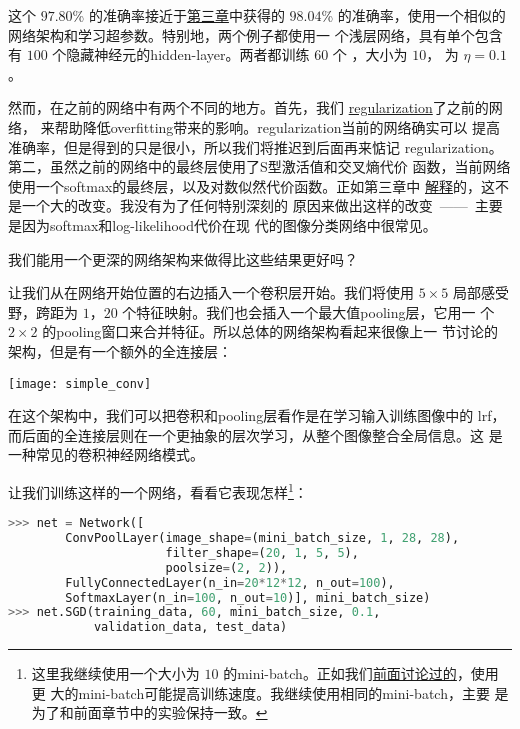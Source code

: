 这个 $97.80$\% 的准确率接近于\hyperref[chap3_98_04_percent]{第三章}中获得的
$98.04$\% 的准确率，使用一个相似的网络架构和学习超参数。特别地，两个例子都使用一
个浅层网络，具有单个包含有 $100$ 个隐藏神经元的\gls*{hidden-layer}。两者都训练 $60$ 个
\epochs{}，\minibatch{}大小为 $10$，\learningrate{} 为 $\eta = 0.1$。

然而，在之前的网络中有两个不同的地方。首先，我们%
\hyperref[sec:overfitting_and_regularization]{\gls*{regularization}}了之前的网络，
来帮助降低\gls*{overfitting}带来的影响。\gls*{regularization}当前的网络确实可以
提高准确率，但是得到的只是很小，所以我们将推迟到后面再来惦记%
\gls*{regularization}。第二，虽然之前的网络中的最终层使用了S型激活值和交叉熵代价
函数，当前网络使用一个\gls*{softmax}的最终层，以及对数似然代价函数。正如第三章中%
\hyperref[subsec:softmax]{解释}的，这不是一个大的改变。我没有为了任何特别深刻的
原因来做出这样的改变~——~主要是因为\gls*{softmax}和\gls*{log-likelihood}代价在现
代的图像分类网络中很常见。

我们能用一个更深的网络架构来做得比这些结果更好吗？

让我们从在网络开始位置的右边插入一个卷积层开始。我们将使用 $5 \times 5$ 局部感受
野，跨距为 $1$，$20$ 个特征映射。我们也会插入一个最大值\gls*{pooling}层，它用一
个 $2 \times 2$ 的\gls*{pooling}窗口来合并特征。所以总体的网络架构看起来很像上一
节讨论的架构，但是有一个额外的全连接层：
\begin{center}
  \texttt{[image: simple\_conv]}  
\end{center}

在这个架构中，我们可以把卷积和\gls*{pooling}层看作是在学习输入训练图像中的%
\gls*{lrf}，而后面的全连接层则在一个更抽象的层次学习，从整个图像整合全局信息。这
是一种常见的卷积神经网络模式。

让我们训练这样的一个网络，看看它表现怎样\footnote{这里我继续使用一个大小为 $10$
  的\gls*{mini-batch}。正如我们\hyperref[mini_batch_size]{前面讨论过的}，使用更
  大的\gls*{mini-batch}可能提高训练速度。我继续使用相同的\gls*{mini-batch}，主要
  是为了和前面章节中的实验保持一致。}：
\begin{lstlisting}[language=Python]
>>> net = Network([
        ConvPoolLayer(image_shape=(mini_batch_size, 1, 28, 28), 
                      filter_shape=(20, 1, 5, 5), 
                      poolsize=(2, 2)),
        FullyConnectedLayer(n_in=20*12*12, n_out=100),
        SoftmaxLayer(n_in=100, n_out=10)], mini_batch_size)
>>> net.SGD(training_data, 60, mini_batch_size, 0.1, 
            validation_data, test_data)
\end{lstlisting}

